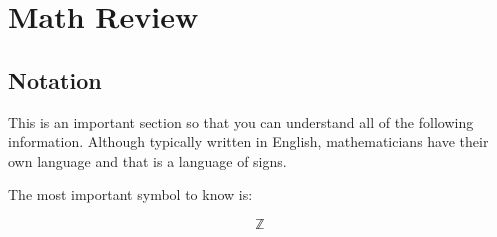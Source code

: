 \documentclass[11pt,fleqn]{book} %
\begin{document}


\pagestyle{empty} %

\tableofcontents %

\cleardoublepage %

\pagestyle{fancy} %






\chapter{Math Review}

\section{Notation}
This is an important section so that you can understand all of the following information. Although typically written in English, mathematicians have their own language and that is a language of signs. 

The most important symbol to know is: 


$$\mathbb{Z}$$



\end{document}

